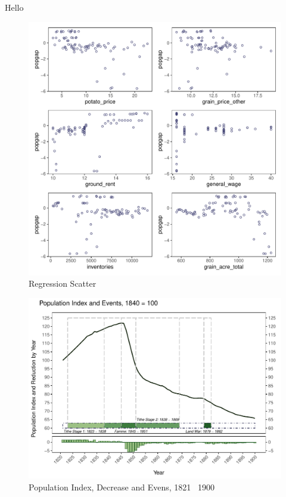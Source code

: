 Hello

\begin{figure}[htbp]
    \centering
    \caption{Regression Scatter}
    \includegraphics[width=.95\textwidth]{../03_outputs/regression_scatter.pdf}
\end{figure}

\begin{figure}[htbp]
    \centering
    \caption{Population Index, Decrease and Evens, 1821 \textendash\ 1900}
    \includegraphics[width=.95\textwidth]{../03_outputs/popline.pdf}
\end{figure}



